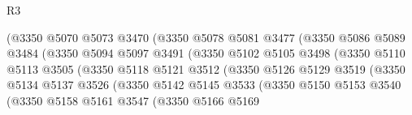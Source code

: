 \begin{lexlean}{R3}
\begin{coremodule}
                                (@3350
                                  @5070
                                  @5073
                                  @3470
                                  (@3350
                                    @5078
                                    @5081
                                    @3477
                                    (@3350
                                      @5086
                                      @5089
                                      @3484
                                      (@3350
                                        @5094
                                        @5097
                                        @3491
                                        (@3350
                                          @5102
                                          @5105
                                          @3498
                                          (@3350
                                            @5110
                                            @5113
                                            @3505
                                            (@3350
                                              @5118
                                              @5121
                                              @3512
                                              (@3350
                                                @5126
                                                @5129
                                                @3519
                                                (@3350
                                                  @5134
                                                  @5137
                                                  @3526
                                                  (@3350
                                                    @5142
                                                    @5145
                                                    @3533
                                                    (@3350
                                                      @5150
                                                      @5153
                                                      @3540
                                                      (@3350
                                                        @5158
                                                        @5161
                                                        @3547
                                                        (@3350
                                                          @5166
                                                          @5169

\end{coremodule}
\end{lexlean}
